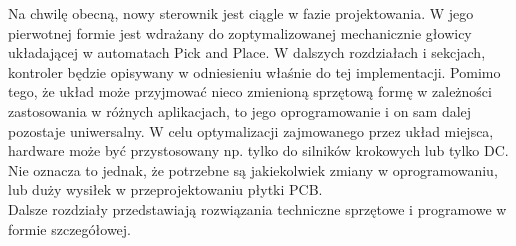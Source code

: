 Na chwilę obecną, nowy sterownik jest ciągle w fazie projektowania. W jego pierwotnej formie jest wdrażany do zoptymalizowanej mechanicznie głowicy układającej w automatach Pick and Place. W dalszych rozdziałach i sekcjach, kontroler będzie opisywany w odniesieniu właśnie do tej implementacji. Pomimo tego, że układ może przyjmować nieco zmienioną sprzętową formę w zależności zastosowania \linebreak w różnych aplikacjach, to jego oprogramowanie i on sam dalej pozostaje uniwersalny. W celu optymalizacji zajmowanego przez układ miejsca, hardware może być przystosowany np. tylko do silników krokowych lub tylko DC. Nie oznacza to jednak, że potrzebne są jakiekolwiek zmiany w oprogramowaniu, lub duży wysiłek w przeprojektowaniu płytki PCB. \\ 

Dalsze rozdziały przedstawiają rozwiązania techniczne sprzętowe i programowe w formie szczegółowej.

\clearpage



